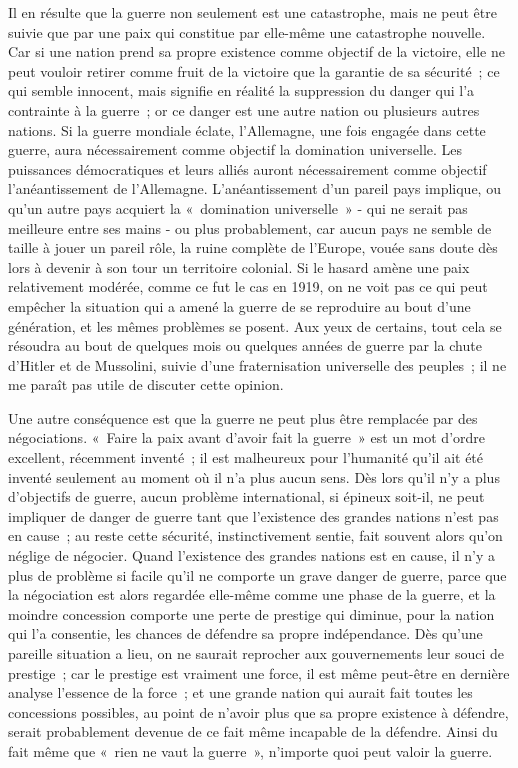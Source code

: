 \documentclass[french,twoside]{book} %
\begin{document}
Il en résulte que la guerre non seulement est une catastrophe, mais ne peut être suivie que par une paix qui constitue par elle-même une catastrophe nouvelle. Car si une nation prend sa propre existence comme objectif de la victoire, elle ne peut vouloir retirer comme fruit de la victoire que la garantie de sa sécurité ; ce qui semble innocent, mais signifie en réalité la suppression du danger qui l'a contrainte à la guerre ; or ce danger est une autre nation ou plusieurs autres nations. Si la guerre mondiale éclate, l'Allemagne, une fois engagée dans cette guerre, aura nécessairement comme objectif la domination universelle. Les puissances démocratiques et leurs alliés auront nécessaire­ment comme objectif l'anéantissement de l'Allemagne. L'anéantissement d'un pareil pays implique, ou qu'un autre pays acquiert la « domination univer­selle » - qui ne serait pas meilleure entre ses mains - ou plus probablement, car aucun pays ne semble de taille à jouer un pareil rôle, la ruine complète de l'Europe, vouée sans doute dès lors à devenir à son tour un territoire colonial. Si le hasard amène une paix relativement modérée, comme ce fut le cas en 1919, on ne voit pas ce qui peut empêcher la situation qui a amené la guerre de se reproduire au bout d'une génération, et les mêmes problèmes se posent. Aux yeux de certains, tout cela se résoudra au bout de quelques mois ou quelques années de guerre par la chute d'Hitler et de Mussolini, suivie d'une fraternisation universelle des peuples ; il ne me paraît pas utile de discuter cette opinion.\par
Une autre conséquence est que la guerre ne peut plus être remplacée par des négociations. « Faire la paix avant d'avoir fait la guerre » est un mot d'ordre excellent, récemment inventé ; il est malheureux pour l'humanité qu'il ait été inventé seulement au moment où il n'a plus aucun sens. Dès lors qu'il n'y a plus d'objectifs de guerre, aucun problème international, si épineux soit-il, ne peut impliquer de danger de guerre tant que l'existence des grandes nations n'est pas en cause ; au reste cette sécurité, instinctivement sentie, fait souvent alors qu'on néglige de négocier. Quand l'existence des grandes nations est en cause, il n'y a plus de problème si facile qu'il ne comporte un grave danger de guerre, parce que la négociation est alors regardée elle-même comme une phase de la guerre, et la moindre concession comporte une perte de prestige qui diminue, pour la nation qui l'a consentie, les chances de défendre sa propre indépendance. Dès qu'une pareille situation a lieu, on ne saurait reprocher aux gouvernements leur souci de prestige ; car le prestige est vraiment une force, il est même peut-être en dernière analyse l'essence de la force ; et une grande nation qui aurait fait toutes les concessions possibles, au point de n'avoir plus que sa propre existence à défendre, serait probablement devenue de ce fait même incapable de la défendre. Ainsi du fait même que « rien ne vaut la guerre », n'importe quoi peut valoir la guerre.\par
\end{document}
